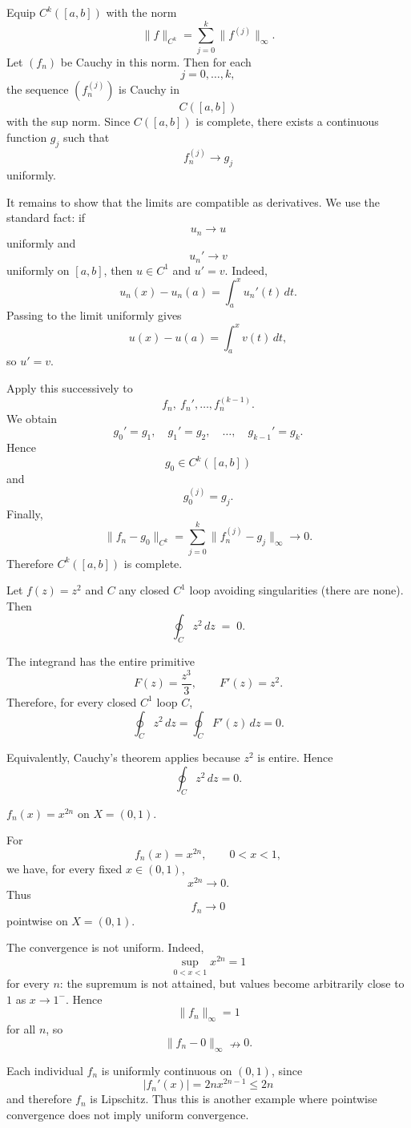 \begin{solution}
Equip \(C^k([a,b])\) with the norm
\[
\|f\|_{C^k}
=
\sum_{j=0}^{k}\|f^{(j)}\|_\infty.
\]
Let \((f_n)\) be Cauchy in this norm. Then for each
\[
j=0,\ldots,k,
\]
the sequence \((f_n^{(j)})\) is Cauchy in
\[
C([a,b])
\]
with the sup norm. Since \(C([a,b])\) is complete, there exists a continuous function \(g_j\) such that
\[
f_n^{(j)}\longrightarrow g_j
\]
uniformly.

It remains to show that the limits are compatible as derivatives. We use the standard fact: if
\[
u_n\to u
\]
uniformly and
\[
u_n'\to v
\]
uniformly on \([a,b]\), then \(u\in C^1\) and \(u'=v\). Indeed,
\[
u_n(x)-u_n(a)
=
\int_a^x u_n'(t)\,dt.
\]
Passing to the limit uniformly gives
\[
u(x)-u(a)
=
\int_a^x v(t)\,dt,
\]
so \(u'=v\).

Apply this successively to
\[
f_n,\ f_n',\ldots,f_n^{(k-1)}.
\]
We obtain
\[
g_0'=g_1,\quad
g_1'=g_2,\quad\ldots,\quad
g_{k-1}'=g_k.
\]
Hence
\[
g_0\in C^k([a,b])
\]
and
\[
g_0^{(j)}=g_j.
\]
Finally,
\[
\|f_n-g_0\|_{C^k}
=
\sum_{j=0}^k
\|f_n^{(j)}-g_j\|_\infty
\longrightarrow0.
\]
Therefore \(C^k([a,b])\) is complete.
\end{solution}


\begin{problem}[CP-IV-0068]
\label{prob:cp-iv-0068}
Let $f(z)=z^{2}$ and $C$ any closed $C^{1}$ loop avoiding singularities (there are none). Then
\[
\oint_{C} z^{2}\,dz \;=\; 0.
\]
\end{problem}

\begin{solution}
The integrand has the entire primitive
\[
F(z)=\frac{z^3}{3},
\qquad
F'(z)=z^2.
\]
Therefore, for every closed \(C^1\) loop \(C\),
\[
\oint_C z^2\,dz
=
\oint_C F'(z)\,dz
=
0.
\]

Equivalently, Cauchy's theorem applies because \(z^2\) is entire. Hence
\[
\boxed{\oint_C z^2\,dz=0}.
\]
\end{solution}


\begin{problem}[CP-IV-0071]
\label{prob:cp-iv-0071}
\par\noindent\textbullet\quad $f_n(x)=x^{2n}$ on $X=(0,1)$.
\end{problem}

\begin{solution}
For
\[
f_n(x)=x^{2n},
\qquad 0<x<1,
\]
we have, for every fixed \(x\in(0,1)\),
\[
x^{2n}\longrightarrow0.
\]
Thus
\[
f_n\longrightarrow0
\]
pointwise on \(X=(0,1)\).

The convergence is not uniform. Indeed,
\[
\sup_{0<x<1}x^{2n}=1
\]
for every \(n\): the supremum is not attained, but values become arbitrarily close to \(1\) as \(x\to1^{-}\). Hence
\[
\|f_n\|_\infty=1
\]
for all \(n\), so
\[
\|f_n-0\|_\infty\nrightarrow0.
\]

Each individual \(f_n\) is uniformly continuous on \((0,1)\), since
\[
|f_n'(x)|=2n x^{2n-1}\le2n
\]
and therefore \(f_n\) is Lipschitz. Thus this is another example where pointwise convergence does not imply uniform convergence.
\end{solution}



